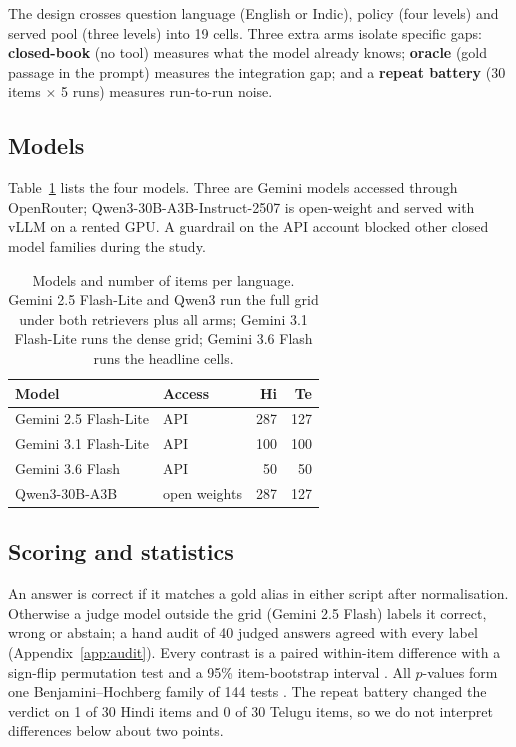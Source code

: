 The design crosses question language (English or Indic), policy (four levels) and served pool (three levels) into 19 cells. Three extra arms isolate specific gaps: \textbf{closed-book} (no tool) measures what the model already knows; \textbf{oracle} (gold passage in the prompt) measures the integration gap; and a \textbf{repeat battery} (30 items $\times$ 5 runs) measures run-to-run noise.

\subsection{Models}
\label{sec:models}
Table~\ref{tab:models} lists the four models. Three are Gemini models accessed through OpenRouter; Qwen3-30B-A3B-Instruct-2507 is open-weight and served with vLLM on a rented GPU. A guardrail on the API account blocked other closed model families during the study.

\begin{table}[t]
\centering\small
\setlength{\tabcolsep}{4pt}
\begin{tabular}{@{}llrr@{}}
\toprule
Model & Access & Hi & Te \\
\midrule
Gemini 2.5 Flash-Lite & API & 287 & 127 \\
Gemini 3.1 Flash-Lite & API & 100 & 100 \\
Gemini 3.6 Flash & API & 50 & 50 \\
Qwen3-30B-A3B & open weights & 287 & 127 \\
\bottomrule
\end{tabular}
\caption{Models and number of items per language. Gemini 2.5 Flash-Lite and Qwen3 run the full grid under both retrievers plus all arms; Gemini 3.1 Flash-Lite runs the dense grid; Gemini 3.6 Flash runs the headline cells.}
\label{tab:models}
\end{table}

\subsection{Scoring and statistics}
\label{sec:stats}
An answer is correct if it matches a gold alias in either script after normalisation. Otherwise a judge model outside the grid (Gemini 2.5 Flash) labels it correct, wrong or abstain; a hand audit of 40 judged answers agreed with every label (Appendix~\ref{app:audit}). Every contrast is a paired within-item difference with a sign-flip permutation test and a 95\% item-bootstrap interval \citep{efron1994bootstrap}. All $p$-values form one Benjamini--Hochberg family of 144 tests \citep{benjamini1995bh}. The repeat battery changed the verdict on 1 of 30 Hindi items and 0 of 30 Telugu items, so we do not interpret differences below about two points.

